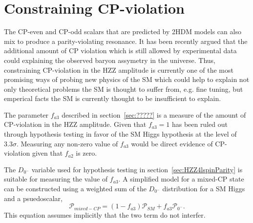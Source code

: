 \section{Constraining CP-violation}
\label{sec:HZZ4lcpViolation}

The CP-even and CP-odd
scalars that are predicted by 2HDM models can also mix to produce
a parity-violating resonance.  It has been recently argued that
the additional amount of CP violation which is still allowed by
experimental data could explaining the observed baryon assymetry
in the universe.  Thus, constraining CP-violation in the HZZ 
amplitude is currently one of the most promising ways of probing
new physics of the SM which could help to explain not only 
theoretical problems the SM is thought to suffer from, e.g. 
fine tuning, but emperical facts the SM is currently thought to
be insufficient to explain.  

The parameter $f_{a3}$ 
described in section~\ref{sec:?????} is a measure of the amount
of CP-violation in the HZZ amplitude.  Given that $f_{a3}=1$
has been ruled out through hypothesis testing in favor of the
SM Higgs hypothesis at the level of $3.3\sigma$.  Measuring any
non-zero value of $f_{a3}$ would be direct evidence of CP-violation
given that $f_{a2}$ is zero.  

The $D_{0^-}$ variable used for hypothesis testing in
section~\ref{sec:HZZ4lspinParity} is suitable for measuring the
value of $f_{a3}$.  A simplified model for a mixed-CP state can 
be constructed 
using a weighted sum of the $D_{0^-}$ distribution for a SM Higgs
and a psuedoscalar, 
\begin{equation}
\mathscr{P}_{mixed-CP} = (1-f_{a3})\mathscr{P}_{SM} 
+ f_{a3}\mathscr{P}_{0^-}.
\end{equation}
This equation assumes implicitly that the two term do not 
interfer.  
